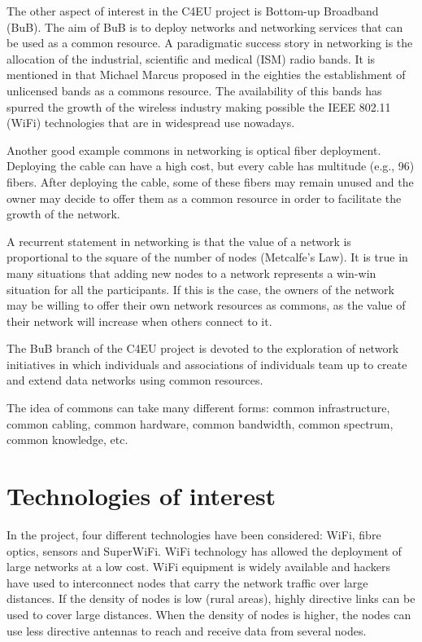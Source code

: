 \documentclass[conference]{IEEEtran}
\begin{document}
The other aspect of interest in the C4EU project is Bottom-up Broadband (BuB).
The aim of BuB is to deploy networks and networking services that can be used as a common resource.
A paradigmatic success story in networking is the allocation of the industrial, scientific and medical (ISM) radio bands.
It is mentioned in \cite{abramson2009asw} that Michael Marcus proposed in the eighties the establishment of unlicensed bands as a commons resource.
The availability of this bands has spurred the growth of the wireless industry making possible the IEEE 802.11 (WiFi) technologies that are in widespread use nowadays.

Another good example commons in networking is optical fiber deployment.
Deploying the cable can have a high cost, but every cable has multitude (e.g., 96) fibers.
After deploying the cable, some of these fibers may remain unused and the owner may decide to offer them as a common resource in order to facilitate the growth of the network.

A recurrent statement in networking is that the value of a network is proportional to the square of the number of nodes (Metcalfe's Law).
It is true in many situations that adding new nodes to a network represents a win-win situation for all the participants.
If this is the case, the owners of the network may be willing to offer their own network resources as commons, as the value of their network will increase when others connect to it.

The BuB branch of the C4EU project is devoted to the exploration of network initiatives in which individuals and associations of individuals team up to create and extend data networks using common resources.

The idea of commons can take many different forms: common infrastructure, common cabling, common hardware, common bandwidth, common spectrum, common knowledge, etc.

\section{Technologies of interest}

In the project, four different technologies have been considered: WiFi, fibre optics, sensors and SuperWiFi.
WiFi technology has allowed the deployment of large networks at a low cost.
WiFi equipment is widely available and hackers have used to interconnect nodes that carry the network traffic over large distances.
If the density of nodes is low (rural areas), highly directive links can be used to cover large distances.
When the density of nodes is higher, the nodes can use less directive antennas to reach and receive data from several nodes.
\end{document}
